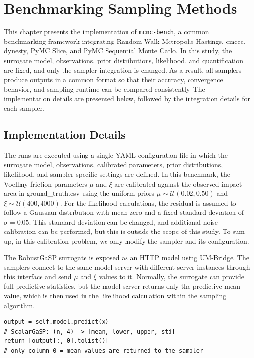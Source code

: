 \chapter{Benchmarking Sampling Methods}
\label{ch:ownwork}

This chapter presents the implementation of \texttt{mcmc-bench}, a common benchmarking framework integrating Random-Walk Metropolis-Hastings, emcee, dynesty, PyMC Slice, and PyMC Sequential Monte Carlo. In this study, the surrogate model, observations, prior distributions, likelihood, and quantification are fixed, and only the sampler integration is changed. As a result, all samplers produce outputs in a common format so that their accuracy, convergence behavior, and sampling runtime can be compared consistently. The implementation details are presented below, followed by the integration details for each sampler.

\section{Implementation Details}
\label{sec:implementation-details}

The runs are executed using a single YAML configuration file in which the surrogate model, observations, calibrated parameters, prior distributions, likelihood, and sampler-specific settings are defined. In this benchmark, the Voellmy friction parameters $\mu$ and $\xi$ are calibrated against the observed impact area in ground\_truth.csv using the uniform priors $\mu \sim \mathcal{U}(0.02,0.50)$ and $\xi \sim \mathcal{U}(400,4000)$. For the likelihood calculations, the residual is assumed to follow a Gaussian distribution with mean zero and a fixed standard deviation of $\sigma=0.05$. This standard deviation can be changed, and additional noise calibration can be performed, but this is outside the scope of this study. To sum up, in this calibration problem, we only modify the sampler and its configuration.

The RobustGaSP surrogate is exposed as an HTTP model using UM-Bridge. The samplers connect to the same model server with different server instances through this interface and send $\mu$ and $\xi$ values to it. Normally, the surrogate can provide full predictive statistics, but the model server returns only the predictive mean value, which is then used in the likelihood calculation within the sampling algorithm.

\begin{lstlisting}
output = self.model.predict(x)
# ScalarGaSP: (n, 4) -> [mean, lower, upper, std]
return [output[:, 0].tolist()]
# only column 0 = mean values are returned to the sampler
\end{lstlisting}

